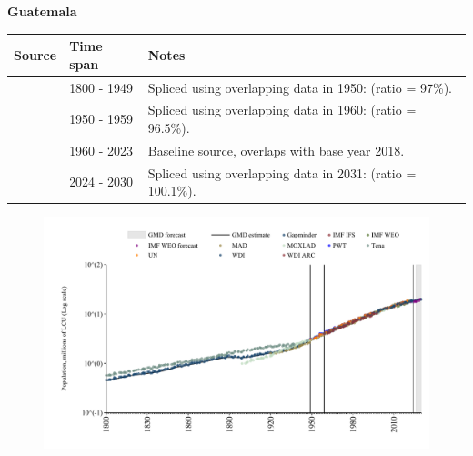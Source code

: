 \documentclass[12pt,a4paper,landscape]{article}
\begin{document}
\begin{adjustbox}{max totalsize={\paperwidth}{\paperheight},center}
\begin{minipage}[t][\textheight][t]{\textwidth}
\vspace*{0.5cm}
{}
\begin{center}
{\Large\bfseries Guatemala}
\end{center}
\vspace{0.5cm}
\begin{table}[H]
\centering
\small
\begin{tabular}{|l|l|l|}
\hline
\textbf{Source} & \textbf{Time span} & \textbf{Notes} \\
\hline
\rowcolor{white}\cite{Gapminder}& 1800 - 1949 &Spliced using overlapping data in 1950: (ratio = 97\%).\\
\rowcolor{lightgray}\cite{IMF_IFS}& 1950 - 1959 &Spliced using overlapping data in 1960: (ratio = 96.5\%).\\
\rowcolor{white}\cite{WDI}& 1960 - 2023 &Baseline source, overlaps with base year 2018.\\
\rowcolor{lightgray}\cite{Gapminder}& 2024 - 2030 &Spliced using overlapping data in 2031: (ratio = 100.1\%).\\
\hline
\end{tabular}
\end{table}
\begin{figure}[H]
\centering
\includegraphics[width=\textwidth,height=0.6\textheight,keepaspectratio]{graphs/GTM_pop.pdf}
\end{figure}
\end{minipage}
\end{adjustbox}
\end{document}
